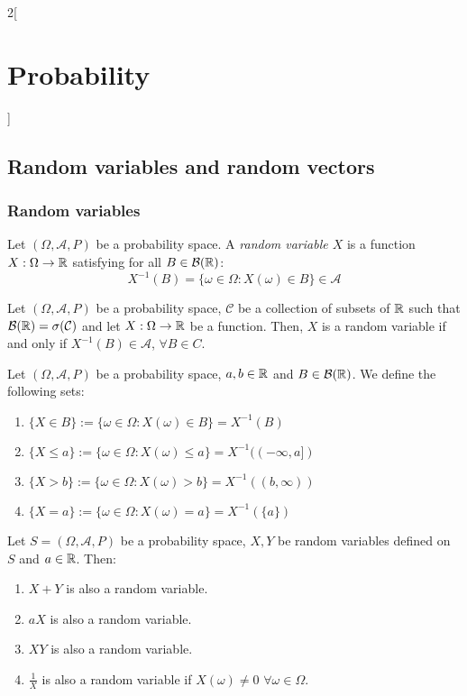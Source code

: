 \documentclass[../../../main.tex]{subfiles}
\begin{document}
\begin{multicols}{2}[\section{Probability}]
  \subsection{Random variables and random vectors}
  \subsubsection{Random variables}
  \begin{definition}
    Let $(\Omega,\mathcal{A},P)$ be a probability space. A \textit{random variable $X$} is a function $X:\Omega\rightarrow\mathbb{R}$ satisfying for all $B\in\mathcal{B}(\mathbb{R})$: $$X^{-1}(B)=\{\omega\in\Omega:X(\omega)\in B\}\in\mathcal{A}$$
  \end{definition}
  \begin{prop}
    Let $(\Omega,\mathcal{A},P)$ be a probability space, $\mathcal{C}$ be a collection of subsets of $\mathbb{R}$ such that $\mathcal{B}(\mathbb{R})=\sigma(\mathcal{C})$ and let $X:\Omega\rightarrow\mathbb{R}$ be a function. Then, $X$ is a random variable if and only if $X^{-1}(B)\in\mathcal{A}$, $\forall B\in C$.
  \end{prop}
  \begin{definition}
    Let $(\Omega,\mathcal{A},P)$ be a probability space, $a,b\in\mathbb{R}$ and $B\in\mathcal{B}(\mathbb{R})$. We define the following sets:
    \begin{enumerate}
      \item $\displaystyle\{X\in B\}:=\{\omega\in\Omega:X(\omega)\in B\}=X^{-1}(B)$
      \item $\displaystyle\{X\leq a\}:=\{\omega\in\Omega:X(\omega)\leq a\}=X^{-1}((-\infty,a])$
      \item $\displaystyle\{X> b\}:=\{\omega\in\Omega:X(\omega)>b\}=X^{-1}((b,\infty))$
      \item $\displaystyle\{X=a\}:=\{\omega\in\Omega:X(\omega)=a\}=X^{-1}(\{a\})$
    \end{enumerate}
  \end{definition}
  \begin{prop}
    Let $S=(\Omega,\mathcal{A},P)$ be a probability space, $X,Y$ be random variables defined on $S$ and $a\in\mathbb{R}$. Then:
    \begin{enumerate}
      \item $X+Y$ is also a random variable.
      \item $aX$ is also a random variable.
      \item $XY$ is also a random variable.
      \item $\frac{1}{X}$ is also a random variable if $X(\omega)\ne 0$ $\forall \omega\in\Omega$.

\end{enumerate}
\end{prop}
\end{multicols}
\end{document}

